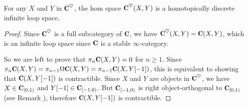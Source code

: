 \begin{lemma}
For any $X$ and $Y$ in $\C^\heart$, the hom space $\C^\heart(X,Y)$ is a homotopically discrete infinite loop space.
\end{lemma}
\begin{proof}
Since $\C^\heart$ is a full subcategory of $\C$, we have $\C^\heart(X,Y)=\C(X,Y)$, which is an infinite loop space since $\C$ is a stable $\infty$-category. 

So we are left to prove that $\pi_n\C(X,Y)=0$ for $n\geq 1$. Since $\pi_n\C(X,Y)=\pi_{n-1}\Omega\C(X,Y)=\pi_{n-1}\C(X,Y[-1])$, this is equivalent to showing that 
$\C(X,Y[-1])$ is contractible. Since $X$ and $Y$ are objects in $\C^\heart$, we have $X\in \C_{[0,1)}$ and $Y[-1]\in \C_{[-1,0)}$. But $\C_{[-1,0)}$ is right object-orthogonal to $\C_{[0,1)}$ (see Remark ), therefore $\C(X,Y[-1])$ is contractible.
\end{proof}

